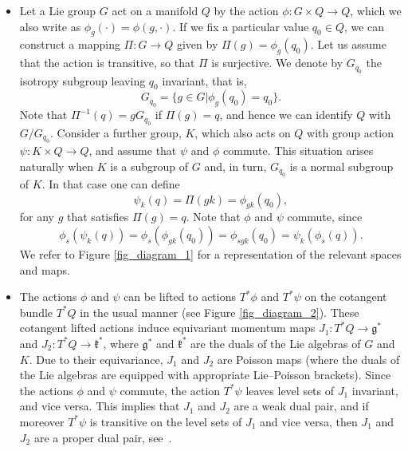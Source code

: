 \documentclass[12pt]{amsart}
\begin{document}
\begin{itemize}
\item
Let a Lie group $G$ act on a manifold $Q$ by the action $\phi: G \times Q \to Q$, which we also write as $\phi_g(\cdot) = \phi(g, \cdot)$. If we fix a particular value $q_0 \in Q$, we can construct a mapping $\Pi: G \to Q$ given by $\Pi(g) = \phi_g(q_0)$. Let us assume that the action is transitive, so that $\Pi$ is surjective. We denote by $G_{q_0}$ the isotropy subgroup leaving $q_0$ invariant, that is,
\begin{equation*}
  G_{q_0} = \{ g \in G | \phi_g(q_0) = q_0\}.
\end{equation*}
Note that $\Pi^{-1}(q) = g G_{q_0}$ if $\Pi(g) = q$, and hence we can identify $Q$  with $G/G_{q_0}$. Consider a further group, $K$, which also acts on $Q$ with group action $\psi: K \times Q \to Q$, and assume that $\psi$ and $\phi$ commute. This situation arises naturally when $K$ is a subgroup of $G$ and, in turn,  $G_{q_0}$ is a normal subgroup of $K$. In that case one can define
\begin{equation}
  \psi_k(q) = \Pi( g k) = \phi_{gk}(q_0), \label{right_ac_general}
\end{equation}
for any $g$ that satisfies $\Pi(g) = q$. Note that $\phi$ and $\psi$ commute, since
\begin{equation*}
  \phi_s(\psi_k (q)) = \phi_s(\phi_{gk}(q_0)) = \phi_{sgk}(q_0) = \psi_k(\phi_s (q)).
\end{equation*}
We refer to Figure \ref{fig_diagram_1} for a representation of the relevant spaces and maps.
\item The actions $\phi$ and $\psi$ can be lifted to actions $T^*\phi$ and $T^*\psi$ on the cotangent bundle $T^*Q$ in the usual manner (see Figure \ref{fig_diagram_2}). These cotangent lifted actions induce equivariant momentum maps $J_1: T^*Q \to \mathfrak{g}^*$ and $J_2:T^*Q \to \mathfrak{k}^*$, where $\mathfrak{g}^*$ and $\mathfrak{k}^*$ are the duals of the Lie algebras of $G$ and $K$. Due to their equivariance, $J_1$ and $J_2$ are Poisson maps (where the duals of the Lie algebras are equipped with appropriate Lie--Poisson brackets). Since the actions $\phi$ and $\psi$ commute, the action $T^*\psi$ leaves level sets of $J_1$ invariant, and vice versa. This implies that $J_1$ and $J_2$ are a weak dual pair, and if moreover $T^*\psi$ is transitive on the level sets of $J_1$ and vice versa, then $J_1$ and $J_2$ are a proper dual pair, see~\cite[Corollary~2.6]{GayBalmazVizman2012}.
%

\end{itemize}
\end{document}
